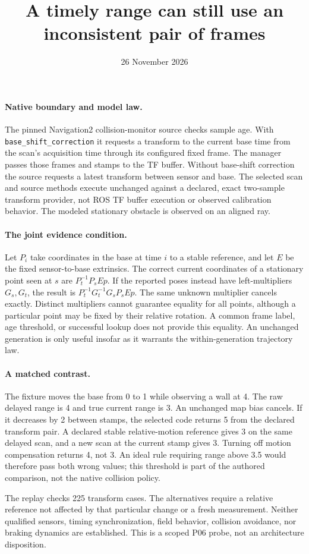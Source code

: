 \documentclass[11pt]{article}
\title{A timely range can still use an inconsistent pair of frames}
\date{26 November 2026}
\begin{document}
\maketitle
\paragraph{Native boundary and model law.}
The pinned Navigation2 collision-monitor source checks sample age.
With \texttt{base\_shift\_correction} it requests a transform to the current
base time from the scan's acquisition time through its configured fixed
frame. The manager passes those frames and stamps to the TF buffer.
Without base-shift correction the source requests a latest transform
between sensor and base. The selected scan and source methods execute
unchanged against a declared, exact two-sample transform provider, not
ROS TF buffer execution or observed calibration behavior. The modeled
stationary obstacle is observed on an aligned ray.

\paragraph{The joint evidence condition.}
Let $P_i$ take coordinates in the base at time $i$ to a stable reference,
and let $E$ be the fixed sensor-to-base extrinsics. The correct current
coordinates of a stationary point seen at $s$ are $P_t^{-1}P_s E p$.
If the reported poses instead have left-multipliers $G_s,G_t$, the
result is $P_t^{-1}G_t^{-1}G_sP_s E p$. The same unknown multiplier
cancels exactly. Distinct multipliers cannot guarantee equality for
all points, although a particular point may be fixed by their relative
rotation. A common frame label, age threshold, or successful lookup
does not provide this equality. An unchanged generation is only
useful insofar as it warrants the within-generation trajectory law.

\paragraph{A matched contrast.}
The fixture moves the base from 0 to 1 while observing a wall at 4.
The raw delayed range is 4 and true current range is 3. An unchanged
map bias cancels. If it decreases by 2 between stamps, the selected
code returns 5 from the declared transform pair. A declared stable
relative-motion reference gives 3 on the same delayed scan, and a
new scan at the current stamp gives 3. Turning off motion compensation
returns 4, not 3. An ideal rule requiring range above 3.5 would
therefore pass both wrong values; this threshold is part of the
authored comparison, not the native collision policy.

The replay checks 225 transform cases. The alternatives require a
relative reference not affected by that particular change or a fresh
measurement. Neither qualified sensors, timing synchronization, field
behavior, collision avoidance, nor braking dynamics are established.
This is a scoped P06 probe, not an architecture disposition.
\end{document}
